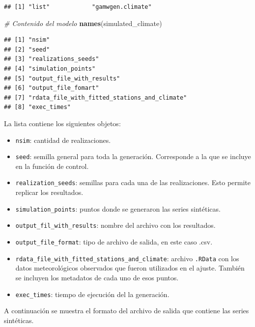 \documentclass[
  12pt]{article}
\newenvironment{Shaded}{}{}
\newcommand{\CommentTok}[1]{\textcolor[rgb]{0.38,0.63,0.69}{\textit{#1}}}
\newcommand{\KeywordTok}[1]{\textcolor[rgb]{0.00,0.44,0.13}{\textbf{#1}}}
\newcommand{\NormalTok}[1]{#1}
\providecommand{\tightlist}{%
  \setlength{\itemsep}{0pt}\setlength{\parskip}{0pt}}
\begin{document}
\begin{verbatim}
## [1] "list"            "gamwgen.climate"
\end{verbatim}

\begin{Shaded}
\begin{Highlighting}[]
\CommentTok{# Contenido del modelo }
\KeywordTok{names}\NormalTok{(simulated_climate)}
\end{Highlighting}
\end{Shaded}

\begin{verbatim}
## [1] "nsim"                                       
## [2] "seed"                                       
## [3] "realizations_seeds"                         
## [4] "simulation_points"                          
## [5] "output_file_with_results"                   
## [6] "output_file_fomart"                         
## [7] "rdata_file_with_fitted_stations_and_climate"
## [8] "exec_times"
\end{verbatim}

La lista contiene los siguientes objetos:

\begin{itemize}
\tightlist
\item
  \texttt{nsim}: cantidad de realizaciones.
\item
  \texttt{seed}: semilla general para toda la generación. Corresponde a la que se incluye en la función de control.
\item
  \texttt{realization\_seeds}: semillas para cada una de las realizaciones. Esto permite replicar los resultados.
\item
  \texttt{simulation\_points}: puntos donde se generaron las series sintéticas.
\item
  \texttt{output\_fil\_with\_results}: nombre del archivo con los resultados.
\item
  \texttt{output\_file\_format}: tipo de archivo de salida, en este caso .csv.
\item
  \texttt{rdata\_file\_with\_fitted\_stations\_and\_climate}: archivo \texttt{.RData} con los datos meteorológicos observados que fueron utilizados en el ajuste. También se incluyen los metadatos de cada uno de esos puntos.
\item
  \texttt{exec\_times}: tiempo de ejecución del la generación.
\end{itemize}

A continuación se muestra el formato del archivo de salida que contiene las series sintéticas.
\end{document}
